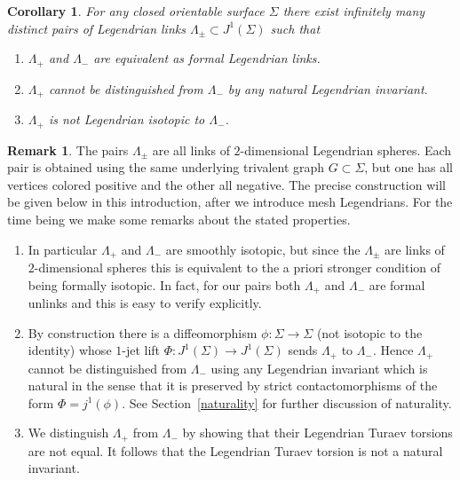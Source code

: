 \documentclass[JEP,XML,SOM,Unicode,NoFloatCountersInSection]{cedram}
\newenvironment{enumeratea}
{\bgroup\def\theenumi{\alph{enumi}}\begin{enumerate}}
{\end{enumerate}\egroup}
\theoremstyle{plain}
\newtheorem{corollary}[theorem]{Corollary}
\theoremstyle{definition}
\newtheorem{remark}[theorem]{Remark}
\begin{document}
\begin{corollary}\label{corollarypairs}
For any closed orientable surface $\Sigma$ there exist infinitely many distinct pairs of Legendrian links $\Lambda_\pm \subset J^1(\Sigma)$ such that
\begin{enumeratea}
\item\label{corollarypairsa}
$\Lambda_+$ and $\Lambda_-$ are equivalent as formal Legendrian links.
\item\label{corollarypairsb}
$\Lambda_+$ cannot be distinguished from $\Lambda_-$ by any natural Legendrian invariant.
\item\label{corollarypairsc}
$\Lambda_+$ is not Legendrian isotopic to $\Lambda_-$.
\end{enumeratea}
\end{corollary}

\begin{remark} The pairs $\Lambda_\pm$ are all links of $2$-dimensional Legendrian spheres. Each pair is obtained using the same underlying trivalent graph $G \subset \Sigma$, but one has all vertices colored positive and the other all negative. The precise construction will be given below in this introduction, after we introduce mesh Legendrians. For the time being we make some remarks about the stated properties.\begin{enumeratea}
\item
In particular $\Lambda_+$ and $\Lambda_-$ are smoothly isotopic, but since the $\Lambda_{\pm}$ are links of $2$-dimensional spheres this is equivalent to the a priori stronger condition of being formally isotopic. In fact, for our pairs both $\Lambda_+$ and $\Lambda_-$ are formal unlinks and this is easy to verify explicitly.
\item
By construction there is a diffeomorphism $\phi: \Sigma \to \Sigma$ (not isotopic to the identity) whose $1$-jet lift $\Phi:J^1(\Sigma) \to J^1(\Sigma)$ sends $\Lambda_+$ to $\Lambda_-$. Hence $\Lambda_+$ cannot be distinguished from $\Lambda_-$ using any Legendrian invariant which is natural in the sense that it is preserved by strict contactomorphisms of the form $\Phi=j^1(\phi)$. See Section~\ref{naturality} for further discussion of naturality.
\item
We distinguish $\Lambda_+$ from $\Lambda_-$ by showing that their Legendrian Turaev torsions are not equal. It follows that the Legendrian Turaev torsion is not a natural invariant.
\end{enumeratea}
\end{remark}
\end{document}
